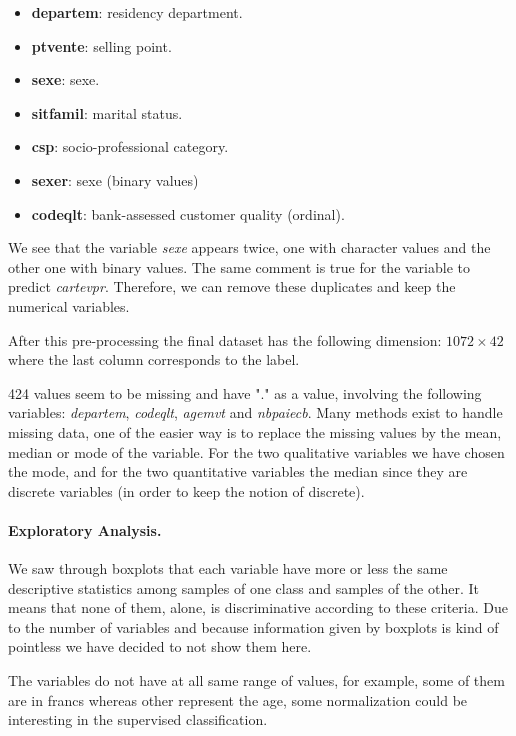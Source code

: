 \begin{itemize}
    \item \textbf{departem}: residency department. 
    \item \textbf{ptvente}: selling point.
    \item \textbf{sexe}: sexe.
    \item \textbf{sitfamil}: marital status.
    \item \textbf{csp}: socio-professional category.
    \item \textbf{sexer}: sexe (binary values)
    \item \textbf{codeqlt}: bank-assessed customer quality (ordinal).
\end{itemize}{}

We see that the variable \textit{sexe} appears twice, one with character values and the other one with binary values. The same comment is true for the variable to predict \textit{cartevpr}. Therefore, we can remove these duplicates and keep the numerical variables.

After this pre-processing the final dataset has the following dimension: $1072 \times 42$ where the last column corresponds to the label.

424 values seem to be missing and have "." as a value, involving the following variables: \textit{departem}, \textit{codeqlt}, \textit{agemvt} and \textit{nbpaiecb}. Many methods exist to handle missing data, one of the easier way is to replace the missing values by the mean, median or mode of the variable. For the two qualitative variables we have chosen the mode, and for the two quantitative variables the median since they are discrete variables (in order to keep the notion of discrete).



\paragraph{Exploratory Analysis.}

We saw through boxplots that each variable have more or less the same descriptive statistics among samples of one class and samples of the other. It means that none of them, alone, is discriminative according to these criteria. Due to the number of variables and because information given by boxplots is kind of pointless we have decided to not show them here.

The variables do not have at all same range of values, for example, some of them are in francs whereas other represent the age, some normalization could be interesting in the supervised classification.


